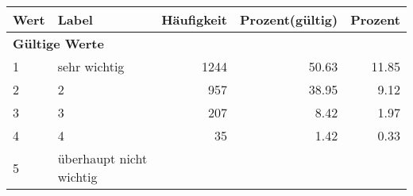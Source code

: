      \begin{longtable}{lXrrr}
     \toprule
     \textbf{Wert} & \textbf{Label} & \textbf{Häufigkeit} & \textbf{Prozent(gültig)} & \textbf{Prozent} \\
     \endhead
     \midrule
     \multicolumn{5}{l}{\textbf{Gültige Werte}}\\

     1 &
     \multicolumn{1}{X}{ sehr wichtig   } &


       \num{1244} &
       \num[round-mode=places,round-precision=2]{50.63} &
         \num[round-mode=places,round-precision=2]{11.85} \\

     2 &
     \multicolumn{1}{X}{ 2   } &


       \num{957} &
       \num[round-mode=places,round-precision=2]{38.95} &
         \num[round-mode=places,round-precision=2]{9.12} \\

     3 &
     \multicolumn{1}{X}{ 3   } &


       \num{207} &
       \num[round-mode=places,round-precision=2]{8.42} &
         \num[round-mode=places,round-precision=2]{1.97} \\

     4 &
     \multicolumn{1}{X}{ 4   } &


       \num{35} &
       \num[round-mode=places,round-precision=2]{1.42} &
         \num[round-mode=places,round-precision=2]{0.33} \\

     5 &
     \multicolumn{1}{X}{ überhaupt nicht wichtig   } &



\end{longtable}
